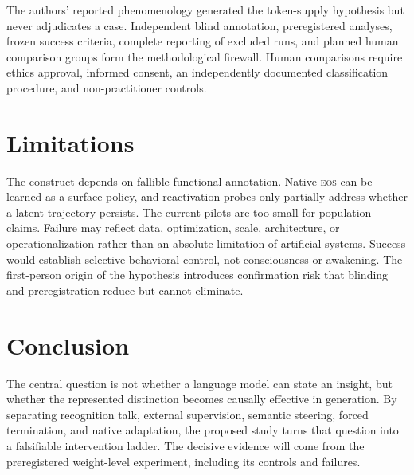 \documentclass[10pt,twocolumn]{article}
\newcommand{\EOS}{\textsc{eos}}
\begin{document}
The authors' reported phenomenology generated the token-supply hypothesis but
never adjudicates a case. Independent blind annotation, preregistered analyses,
frozen success criteria, complete reporting of excluded runs, and planned human
comparison groups form the methodological firewall. Human comparisons require
ethics approval, informed consent, an independently documented classification
procedure, and non-practitioner controls.

\section{Limitations}

The construct depends on fallible functional annotation. Native \EOS{} can be
learned as a surface policy, and reactivation probes only partially address
whether a latent trajectory persists. The current pilots are too small for
population claims. Failure may reflect data, optimization, scale, architecture,
or operationalization rather than an absolute limitation of artificial systems.
Success would establish selective behavioral control, not consciousness or
awakening. The first-person origin of the hypothesis introduces confirmation
risk that blinding and preregistration reduce but cannot eliminate.

\section{Conclusion}

The central question is not whether a language model can state an insight, but
whether the represented distinction becomes causally effective in generation.
By separating recognition talk, external supervision, semantic steering, forced
termination, and native adaptation, the proposed study turns that question into
a falsifiable intervention ladder. The decisive evidence will come from the
preregistered weight-level experiment, including its controls and failures.



\end{document}
